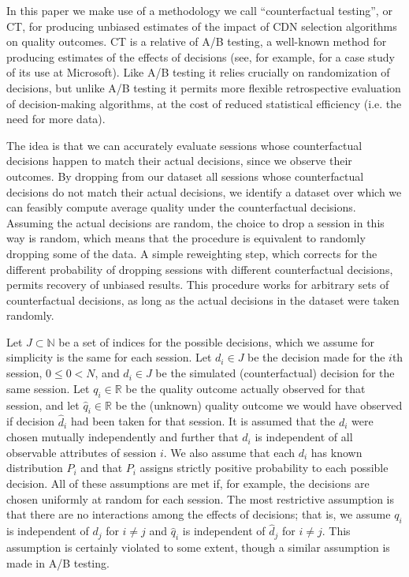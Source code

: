 \label{sec:counterfactualtesting}
In this paper we make use of a methodology we call ``counterfactual testing'', or CT, for producing unbiased estimates of the impact of CDN selection algorithms on quality outcomes.  CT is a relative of A/B testing, a well-known method for producing estimates of the effects of decisions (see, for example, \cite{kohavi2009online} for a case study of its use at Microsoft).  Like A/B testing it relies crucially on randomization of decisions, but unlike A/B testing it permits more flexible retrospective evaluation of decision-making algorithms, at the cost of reduced statistical efficiency (i.e. the need for more data).  

The idea is that we can accurately evaluate sessions whose counterfactual decisions happen to match their actual decisions, since we observe their outcomes.  By dropping from our dataset all sessions whose counterfactual decisions do not match their actual decisions, we identify a dataset over which we can feasibly compute average quality under the counterfactual decisions.  Assuming the actual decisions are random, the choice to drop a session in this way is random, which means that the procedure is equivalent to randomly dropping some of the data.  A simple reweighting step, which corrects for the different probability of dropping sessions with different counterfactual decisions, permits recovery of unbiased results.  This procedure works for arbitrary sets of counterfactual decisions, as long as the actual decisions in the dataset were taken randomly.

Let $J \subset \mathbb{N}$ be a set of indices for the possible decisions, which we assume for simplicity is the same for each session.  Let $d_i \in J$ be the decision made for the $i$th session, $0 \leq 0 < N$, and $\hat{d}_i \in J$ be the simulated (counterfactual) decision for the same session.  Let $q_i \in \mathbb{R}$ be the quality outcome actually observed for that session, and let $\hat{q}_i \in \mathbb{R}$ be the (unknown) quality outcome we would have observed if decision $\hat{d}_i$ had been taken for that session.  It is assumed that the $d_i$ were chosen mutually independently and further that $d_i$ is independent of all observable attributes of session $i$.  We also assume that each $d_i$ has known distribution $P_i$ and that $P_i$ assigns strictly positive probability to each possible decision.  All of these assumptions are met if, for example, the decisions are chosen uniformly at random for each session.  The most restrictive assumption is that there are no interactions among the effects of decisions; that is, we assume $q_i$ is independent of $d_j$ for $i \neq j$ and $\hat{q}_i$ is independent of $\hat{d}_j$ for $i \neq j$.  This assumption is certainly violated to some extent, though a similar assumption is made in A/B testing.

